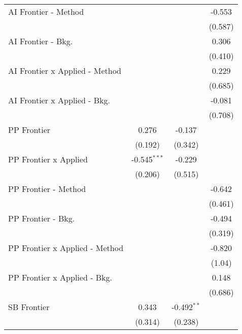\begin{tabular}{lccc}
   AI Frontier - Method           &                &               & -0.553\\   
                                  &                &               & (0.587)\\   
   AI Frontier - Bkg.             &                &               & 0.306\\   
                                  &                &               & (0.410)\\   
   AI Frontier x Applied - Method &                &               & 0.229\\   
                                  &                &               & (0.685)\\   
   AI Frontier x Applied - Bkg.   &                &               & -0.081\\   
                                  &                &               & (0.708)\\   
   PP Frontier                    & 0.276          & -0.137        &   \\   
                                  & (0.192)        & (0.342)       &   \\   
   PP Frontier x Applied          & -0.545$^{***}$ & -0.229        &   \\   
                                  & (0.206)        & (0.515)       &   \\   
   PP Frontier - Method           &                &               & -0.642\\   
                                  &                &               & (0.461)\\   
   PP Frontier - Bkg.             &                &               & -0.494\\   
                                  &                &               & (0.319)\\   
   PP Frontier x Applied - Method &                &               & -0.820\\   
                                  &                &               & (1.04)\\   
   PP Frontier x Applied - Bkg.   &                &               & 0.148\\   
                                  &                &               & (0.686)\\   
   SB Frontier                    & 0.343          & -0.492$^{**}$ &   \\   
                                  & (0.314)        & (0.238)       &   \\   

\end{tabular}
